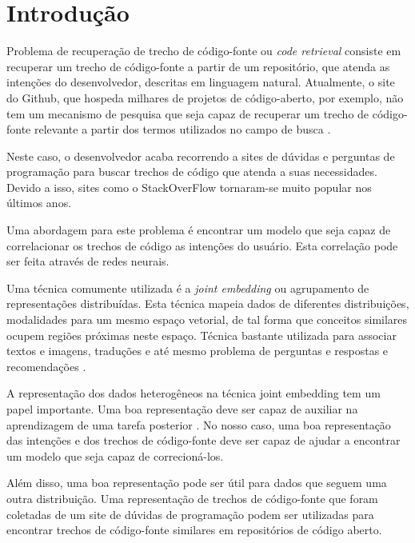 \chapter{Introdução}
\label{cap:introducao}


Problema de recuperação de trecho de código-fonte ou \textit{code retrieval} consiste em recuperar um trecho de código-fonte a partir de um repositório, que atenda as intenções do desenvolvedor, descritas em linguagem natural. Atualmente, o site do Github, que hospeda milhares de projetos de código-aberto, por exemplo, não tem um mecanismo de pesquisa que
seja capaz de recuperar um trecho de código-fonte relevante a partir dos termos utilizados no campo de busca \citep{cambronero-deep-learning-code-search:2019}.

Neste caso, o desenvolvedor acaba recorrendo a sites de dúvidas e perguntas de programação para buscar trechos de código que atenda a suas necessidades. Devido a isso, sites como o
StackOverFlow tornaram-se muito popular nos últimos anos.


Uma abordagem para este problema é encontrar um \gls{modelo} que seja capaz de correlacionar os trechos de código as intenções do usuário. Esta correlação pode ser feita através de redes neurais. 

Uma técnica comumente utilizada é a \textit{joint embedding} ou agrupamento de representações distribuídas. Esta técnica mapeia dados de diferentes distribuições, modalidades para um mesmo espaço vetorial, de tal forma que conceitos similares ocupem regiões próximas neste espaço. Técnica bastante utilizada para associar textos e imagens, traduções e até mesmo problema de perguntas e respostas e recomendações \citep{lai-etal-2018-review, Zhang:2019:deep-learning-recommender-survey}.

A representação dos dados heterogêneos na técnica joint embedding tem um papel importante. Uma boa representação deve ser capaz de auxiliar na aprendizagem de uma tarefa
posterior \citep{Goodfellow-et-al-2016:representation-learning}. No nosso caso, uma boa representação das intenções e dos trechos de código-fonte deve ser capaz de ajudar a encontrar um modelo que seja capaz de correcioná-los. 

Além disso, uma boa representação pode ser útil para dados que seguem uma outra distribuição. Uma representação de trechos de código-fonte que foram coletadas de um site de dúvidas de programação podem ser utilizadas para encontrar trechos de código-fonte similares em repositórios de código aberto.

